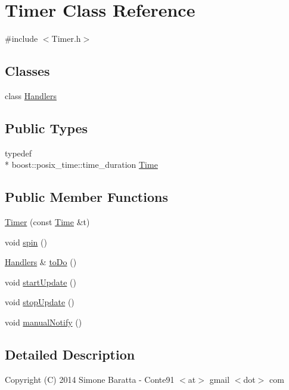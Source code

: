 \hypertarget{class_timer}{\section{Timer Class Reference}
\label{class_timer}
}


{\ttfamily \#include $<$Timer.\+h$>$}

\subsection*{Classes}
\begin{DoxyCompactItemize}
\item 
class \hyperlink{class_timer_1_1_handlers}{Handlers}
\end{DoxyCompactItemize}
\subsection*{Public Types}
\begin{DoxyCompactItemize}
\item 
typedef \\*
boost\+::posix\+\_\+time\+::time\+\_\+duration \hyperlink{class_timer_ad4fe4f911b3f67a6304b506f36acd97c}{Time}
\end{DoxyCompactItemize}
\subsection*{Public Member Functions}
\begin{DoxyCompactItemize}
\item 
\hyperlink{class_timer_ad3dafcc3862f8f4a5016a64b6260e280}{Timer} (const \hyperlink{class_timer_ad4fe4f911b3f67a6304b506f36acd97c}{Time} \&t)
\item 
void \hyperlink{class_timer_a7192654fa97ebcd5146223e3056b13b4}{spin} ()
\item 
\hyperlink{class_timer_1_1_handlers}{Handlers} \& \hyperlink{class_timer_a2ee5b8475f2f5ca9f3af43208829d25e}{to\+Do} ()
\item 
void \hyperlink{class_timer_a738f7d777c9e9e7eadf504f89499282f}{start\+Update} ()
\item 
void \hyperlink{class_timer_a42059d51f532bef30719938a163d854a}{stop\+Update} ()
\item 
void \hyperlink{class_timer_a6c3cd8e5401a3db30e38e675b08dfd37}{manual\+Notify} ()
\end{DoxyCompactItemize}


\subsection{Detailed Description}
Copyright (C) 2014 Simone Baratta -\/ Conte91 $<$at$>$ gmail $<$dot$>$ com

